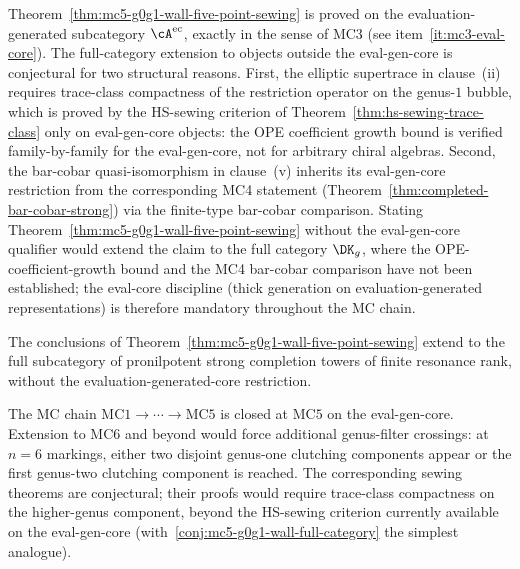 \begin{remark}
\label{rem:mc5-g0g1-evcore-qualifier}
Theorem~\ref{thm:mc5-g0g1-wall-five-point-sewing} is proved on the
evaluation-generated subcategory $\cA^{\evcore}$, exactly in the sense of
MC3 \textup{(}see item~\ref{it:mc3-eval-core}\textup{)}.
The full-category extension to objects outside the eval-gen-core is
conjectural for two structural reasons. First, the elliptic supertrace
in clause~\textup{(ii)} requires trace-class compactness of the
restriction operator on the genus-$1$ bubble, which is proved by the
HS-sewing criterion of Theorem~\ref{thm:hs-sewing-trace-class} only on
eval-gen-core objects: the OPE coefficient growth bound is verified
family-by-family for the eval-gen-core, not for arbitrary chiral algebras.
Second, the bar-cobar quasi-isomorphism in clause~\textup{(v)} inherits
its eval-gen-core restriction from the corresponding MC4 statement
\textup{(}Theorem~\ref{thm:completed-bar-cobar-strong}\textup{)} via the
finite-type bar-cobar comparison. Stating
Theorem~\ref{thm:mc5-g0g1-wall-five-point-sewing} without the eval-gen-core
qualifier would extend the claim to the full category $\DK_g$, where
the OPE-coefficient-growth bound and the MC4 bar-cobar comparison have
not been established; the eval-core discipline (thick generation on
evaluation-generated representations) is therefore mandatory throughout
the MC chain.
\end{remark}

\begin{conjecture}
\label{conj:mc5-g0g1-wall-full-category}
The conclusions of Theorem~\ref{thm:mc5-g0g1-wall-five-point-sewing}
extend to the full subcategory of pronilpotent strong completion towers
of finite resonance rank, without the evaluation-generated-core
restriction.
\ClaimStatusConjectured{}
\end{conjecture}

\begin{remark}
\label{rem:mc5-g0g1-higher-stage-conjectural}
The MC chain $\mathrm{MC1} \to \cdots \to \mathrm{MC5}$ is closed at
$\mathrm{MC5}$ on the eval-gen-core. Extension to $\mathrm{MC6}$ and
beyond would force additional genus-filter crossings: at $n = 6$ markings,
either two disjoint genus-one clutching components appear or the first
genus-two clutching component is reached. The corresponding sewing
theorems are conjectural; their proofs would require trace-class
compactness on the higher-genus component, beyond the HS-sewing
criterion currently available on the eval-gen-core
\textup{(}with~\ref{conj:mc5-g0g1-wall-full-category} the simplest
analogue\textup{)}.
\end{remark}

